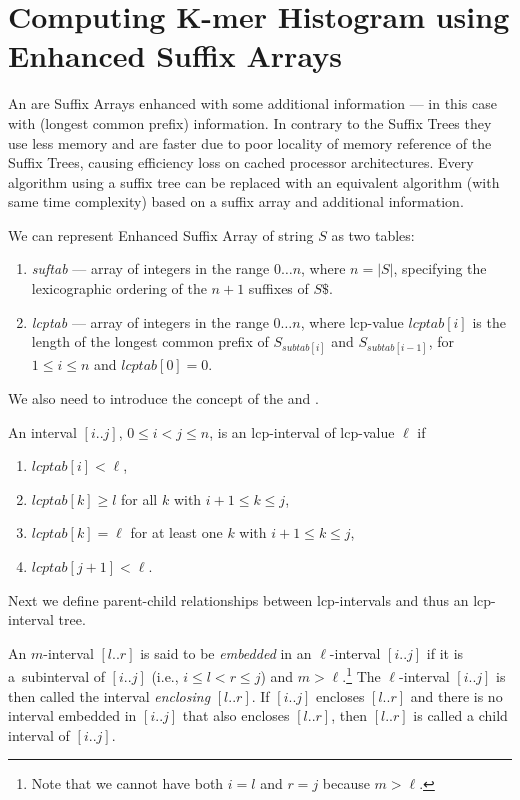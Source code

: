 \section{Computing K-mer Histogram using Enhanced Suffix Arrays}

An  are Suffix Arrays enhanced with some additional information --- in this case with  (longest common prefix) information.
In contrary to the Suffix Trees they use less memory and are faster due to poor locality of memory reference of the Suffix Trees, causing efficiency loss on cached processor architectures.
Every algorithm using a suffix tree can be replaced with an equivalent
algorithm (with same time complexity) based on a suffix array and additional information\cite{enhancedsuffixarrays}.

We can represent Enhanced Suffix Array of string $S$ as two tables:
\begin{enumerate}
  \item \emph{suftab} --- array of integers in the range $0\dots n$, where $n = |S|$, specifying the lexicographic ordering of the $n + 1$ suffixes of $S\$ $.
  \item \emph{lcptab} --- array of integers in the range $0\dots n$, where lcp-value $lcptab[i]$ is the length of the longest common prefix of $S_{subtab[i]}$ and $S_{subtab[i-1]}$, for $1 \leq i \leq n$ and $lcptab[0] = 0$.
\end{enumerate}

We also need to introduce the concept of the  and .
\begin{definition}
An interval $[i..j]$, $0 \leq i < j \leq n$, is an lcp-interval of lcp-value $\ell$ if

\begin{enumerate}
\item $lcptab[i] < \ell$,
\item $lcptab[k] \geq l$ for all $k$ with $i + 1 \leq k \leq j$,
\item $lcptab[k] = \ell$ for at least one $k$ with $i + 1 \leq k \leq j$,
\item $lcptab[j + 1] < \ell$.
\end{enumerate}
\cite{enhancedsuffixarrays}
\end{definition}

Next we define parent-child relationships between lcp-intervals and thus an lcp-interval tree.

\begin{definition}
  An $m$-interval $[l..r]$ is said to be \emph{embedded} in an $\ell$-interval $[i..j]$ if it is a~subinterval of $[i..j]$ (i.e., $i \leq l < r \leq j $) and $m > \ell$.\footnote{Note that we cannot have both $i = l$ and $r = j$ because $m > \ell$.}
  The $\ell$-interval $[i..j ]$ is then called the interval \emph{enclosing} $[l..r]$. If $[i..j]$ encloses $[l..r]$ and there is no interval embedded in $[i..j]$ that also encloses $[l..r]$, then $[l..r]$ is called a child interval of $[i..j]$.\cite{enhancedsuffixarrays}
\end{definition}

